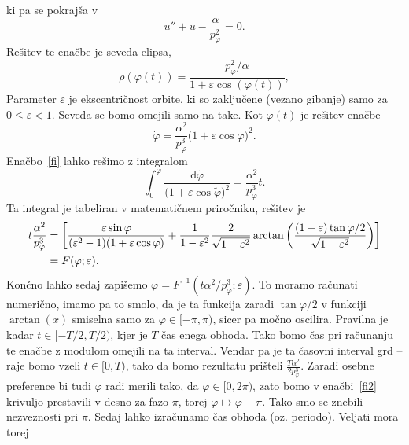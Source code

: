 \documentclass[12pt, a4paper]{article}
\renewcommand{\d}{
    \ensuremath{\mathrm{d}}
}
\begin{document}
ki pa se pokraj\v sa v
\begin{equation}
    u'' + u - \frac{\alpha}{p^2_\varphi} = 0.
\end{equation}
Re\v sitev te ena\v cbe je seveda elipsa,
\begin{equation}
    \rho(\varphi(t)) = \frac{p_\varphi^2/\alpha}{1 + \varepsilon\cos(\varphi(t))},
\end{equation}
Parameter $\varepsilon$ je ekscentri\v cnost orbite, ki so zaklju\v cene (vezano gibanje) samo za
$0 \leq \varepsilon < 1$. Seveda se bomo omejili samo na take.
Kot $\varphi(t)$ je re\v sitev ena\v cbe
\begin{equation}
    \dot{\varphi} = \frac{\alpha^2}{p_\varphi^3}\big(1 + \varepsilon\cos\varphi\big)^2.
    \label{fi}
\end{equation}
Ena\v cbo~\eqref{fi} lahko re\v simo z integralom
\begin{equation}
    \int_0^{\varphi}\frac{\d \tilde{\varphi}}{\big(1 + \varepsilon\cos\tilde{\varphi}\big)^2} = \frac{\alpha^2}{p_\varphi^3}t.
\end{equation}
Ta integral je tabeliran v matemati\v cnem priro\v cniku, re\v sitev je
\begin{align}
    t\frac{\alpha^2}{p^3_\varphi} &= \bigg[\frac{\varepsilon\sin\varphi}{(\varepsilon^2 - 1)(1 + \varepsilon\cos\varphi)}
            +\frac{1}{1 - \varepsilon^2}\frac{2}{\sqrt{1 - \varepsilon^2}}\arctan\bigg(\frac{(1 - \varepsilon)\tan\varphi/2}
            {\sqrt{1 - \varepsilon^2}}\bigg)\bigg] \notag \\
        &= F(\varphi; \varepsilon).
    \label{fi2}
\end{align}
Kon\v cno lahko sedaj zapi\v semo $\varphi = F^{-1}(t\alpha^2/p^3_\varphi; \varepsilon)$. To moramo ra\v cunati
numeri\v cno, imamo pa to smolo, da je ta funkcija zaradi $\tan\varphi/2$ v funkciji $\arctan(x)$ smiselna samo za
$\varphi \in [-\pi,\pi)$, sicer pa mo\v cno oscilira. Pravilna je kadar $t \in [-T/2, T/2)$, kjer je $T$ \v cas enega
obhoda. Tako bomo \v cas pri ra\v cunanju te ena\v cbe z modulom omejili na ta interval. Vendar pa je ta \v casovni
interval grd -- raje bomo vzeli $t \in [0, T)$, tako da bomo rezultatu pri\v steli $\frac{T\alpha^2}{2p^3_\varphi}$.
Zaradi osebne preference bi tudi $\varphi$ radi merili tako, da $\varphi \in [0, 2\pi)$, zato bomo v ena\v cbi~\eqref{fi2}
krivuljo prestavili v desno za fazo $\pi$, torej $\varphi \mapsto \varphi - \pi$. Tako smo se znebili nezveznosti pri
$\pi$. Sedaj lahko izra\v cunamo \v cas obhoda (oz. periodo). Veljati mora torej
\end{document}
